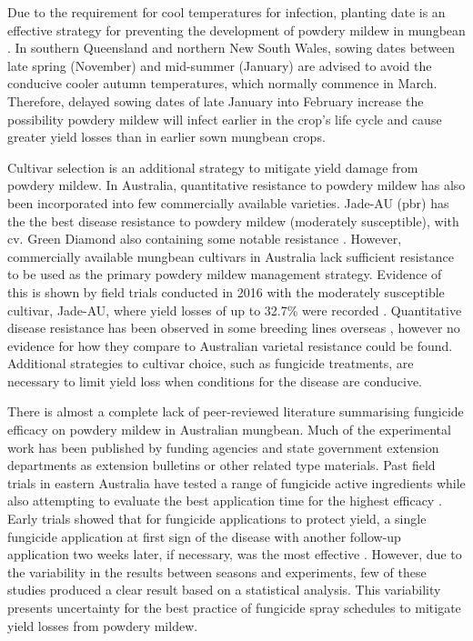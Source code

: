 \documentclass[agronomy,article,submit,moreauthors,pdftex]{mdpi}
\begin{document}
Due to the requirement for cool temperatures for infection, planting date is an effective strategy for preventing the development of powdery mildew in mungbean \citep{AMAplanting}.
In southern Queensland and northern New South Wales, sowing dates between late spring (November) and mid-summer (January) are advised to avoid the conducive cooler autumn temperatures, which normally commence in March.
Therefore, delayed sowing dates of late January into February increase the possibility powdery mildew will infect earlier in the crop's life cycle and cause greater yield losses than in earlier sown mungbean crops.

Cultivar selection is an additional strategy to mitigate yield damage from powdery mildew.
In Australia, quantitative resistance to powdery mildew has also been incorporated into few commercially available varieties.
Jade-AU {(pbr)} has the the best disease resistance to powdery mildew (moderately susceptible), with cv. Green Diamond also containing some notable resistance \citep{Sparks2017}.
However, commercially available mungbean cultivars in Australia lack sufficient resistance to be used as the primary powdery mildew management strategy.
Evidence of this is shown by field trials conducted in 2016 with the moderately susceptible cultivar, Jade-AU, where yield losses of up to 32.7\% were recorded \citep{SueThompson2016}.
Quantitative disease resistance has been observed in some breeding lines overseas \citep{Pandey2018, Chankaew2013}, however no evidence for how they compare to Australian varietal resistance could be found.
Additional strategies to cultivar choice, such as fungicide treatments, are necessary to limit yield loss when conditions for the disease are conducive.

There is almost a complete lack of peer-reviewed literature summarising fungicide efficacy on powdery mildew in Australian mungbean.
Much of the experimental work has been published by funding agencies and state government extension departments as extension bulletins or other related type materials.
Past field trials in eastern Australia have tested a range of fungicide active ingredients while also attempting to evaluate the best application time for the highest efficacy \citep{goolhi2013, premer2013, Millmerran2013, Marysmount2013, SueThompson2016, Kelly2017a, Thompson2016}.
Early trials showed that for fungicide applications to protect yield, a single fungicide application at first sign of the disease with another follow-up application two weeks later, if necessary, was the most effective \citep{SueThompson2016, Sparks2017}.
However, due to the variability in the results between seasons and experiments, few of these studies produced a clear result based on a statistical analysis.
This variability presents uncertainty for the best practice of fungicide spray schedules to mitigate yield losses from powdery mildew.
\end{document}
